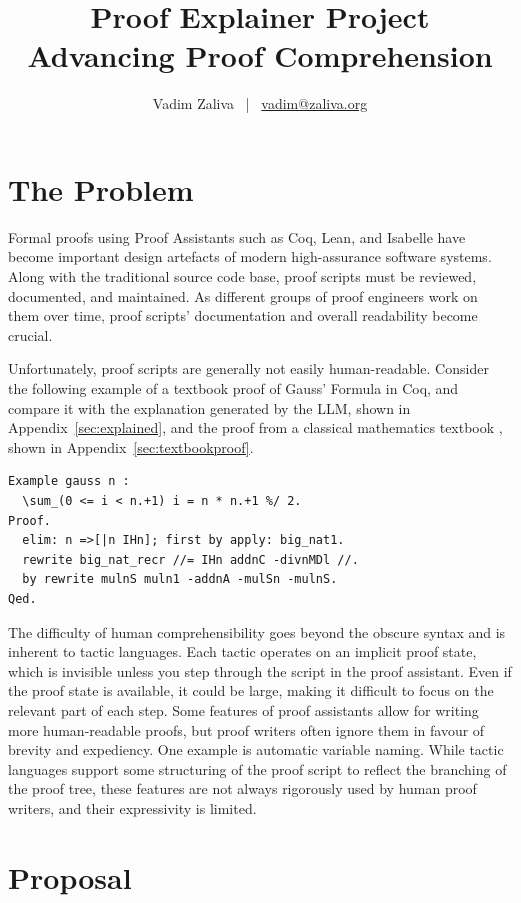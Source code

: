 \documentclass[letterpaper]{article}
\title{Proof Explainer Project \\ \large Advancing Proof Comprehension}
\date{} %
\author{Vadim Zaliva ~|~ \href{mailto:vadim@zaliva.org}{vadim@zaliva.org}}
\begin{document}
\maketitle
\thispagestyle{fancy}
\section*{The Problem}

Formal proofs using Proof Assistants such as Coq, Lean, and Isabelle
have become important design artefacts of modern high-assurance
software systems. Along with the traditional source code base, proof
scripts must be reviewed, documented, and maintained. As different
groups of proof engineers work on them over time, proof scripts'
documentation and overall readability become crucial.

Unfortunately, proof scripts are generally not easily
human-readable. Consider the following example of a textbook
\cite{mahboubi2021mathematical} proof of Gauss' Formula in Coq, and
compare it with the explanation generated by the LLM, shown in
Appendix~\ref{sec:explained}, and the proof from a classical
mathematics textbook \cite{roberts2014introduction}, shown in
Appendix~\ref{sec:textbookproof}.

\begin{lstlisting}
Example gauss n :
  \sum_(0 <= i < n.+1) i = n * n.+1 %/ 2.
Proof.
  elim: n =>[|n IHn]; first by apply: big_nat1.
  rewrite big_nat_recr //= IHn addnC -divnMDl //.
  by rewrite mulnS muln1 -addnA -mulSn -mulnS.
Qed.
\end{lstlisting}

The difficulty of human comprehensibility goes beyond the obscure
syntax and is inherent to tactic languages. Each tactic operates on an
implicit proof state, which is invisible unless you step through the
script in the proof assistant. Even if the proof state is available,
it could be large, making it difficult to focus on the relevant part
of each step. Some features of proof assistants allow for writing more
human-readable proofs, but proof writers often ignore them in favour
of brevity and expediency. One example is automatic variable
naming. While tactic languages support some structuring of the proof
script to reflect the branching of the proof tree, these features are
not always rigorously used by human proof writers, and their
expressivity is limited.

\section*{Proposal}
\end{document}
